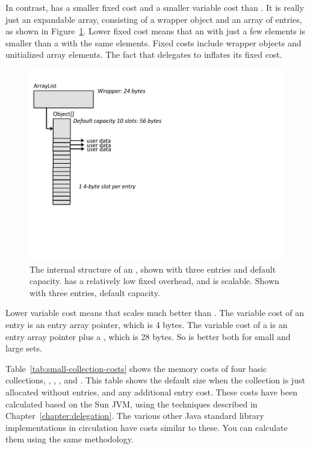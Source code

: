 In contrast,  has a
smaller fixed cost and a smaller variable cost than . It is really just an expandable array,
consisting of a wrapper object and an array of entries, as shown in
Figure~\ref{fig:inside-arraylist}.
Lower fixed cost means that an  with just a few
 elements is smaller than a  with the same elements. Fixed costs
 include wrapper objects and unitialized array elements. The fact that 
 delegates to  inflates its fixed cost. 
 \begin{figure}
  \centering
 \includegraphics[width=.80\textwidth]{part1/Figures/collections/inside-arraylist.pdf}
 \caption{The internal structure of an , shown with three
 entries and default capacity.  has a relatively low
 fixed overhead, and is scalable.
 Shown with three entries, default capacity.}
  \label{fig:inside-arraylist}
\end{figure}
 Lower variable cost means that
  scales much better than . The variable cost
 of an  entry is an entry array pointer, which is 4 bytes.
 The variable cost of a  is an entry array pointer plus a
 , which is 28 bytes. So   is better
 both for small and large sets.

Table~\ref{tab:small-collection-costs} shows the memory costs of four basic
collections, , , , and .
This table shows the default size when the collection is just allocated without
entries, and any additional entry cost. These costs have
been calculated based on the Sun JVM, using the techniques described in Chapter~\ref{chapter:delegation}. 
The various other Java standard
library implementations in circulation have costs
similar to these. You can calculate them using the same methodology.


